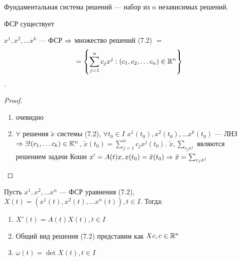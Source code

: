 \begin{definition}
    Фундаментальная система решений --- набор из \(n\) независимых решений.
\end{definition}

\begin{proposition}
    ФСР существует
\end{proposition}

\begin{proposition}
    \(x^1, x^2, \dots x^k\) --- ФСР \(\Rightarrow\) множество решений (7.2) \(=\)
    \[= \left\{ \sum_{j = 1}^n c_jx^j: (c_1, c_2, \dots c_n) \in \mathbb{R}^n \right\}\].
\end{proposition}
\begin{proof}\indent
    \begin{enumerate}
        \item[\(\supset\)] очевидно
        \item[\(\subset\)] \(\forall\) решения \(\tilde{x}\) системы (7.2), \(\forall t_0 \in I\)
        \(x^1(t_0), x^2(t_0), \dots x^k(t_0)\) --- ЛНЗ \(\Rightarrow \exists ! (c_1, \dots c_k) \in \mathbb{K}^n\), \(\tilde{x}(t_0) = \sum_{j = 1}^nc_jx^j(t_0)\).
        \(\tilde{x}, \sum_{c_jx^j}\) являются решением задачи Коши \(x' = A(t)x, x(t_0) = \tilde{x}(t_0)\Rightarrow \tilde{x} = \sum_{c_jx^j}\) 
    \end{enumerate}
\end{proof}

\begin{note}
    Пусть \(x^1, x^2, \dots x^n\) --- ФСР уравнения (7.2), \(X(t) = (x^1(t), x^2(t), \dots x^n(t)), t \in I\). Тогда:
    \begin{enumerate}
        \item \(X'(t) = A(t)X(t), t \in I\)
        \item Общий вид решения (7.2) представим как \(Xc, c \in \mathbb{R}^n\)
        \item \(\omega(t) = \det X(t), t \in I\)
    \end{enumerate}
\end{note}

